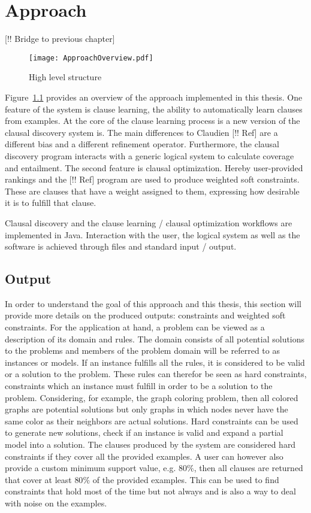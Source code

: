 \chapter{Approach}
\label{cha:meth}

[!! Bridge to previous chapter]

\begin{figure}

	\caption{High level structure}
	\centering
		\texttt{[image: ApproachOverview.pdf]}
	\label{fig:high_level_structure}

\end{figure}

Figure~\ref{fig:high_level_structure} provides an overview of the approach implemented in this thesis.
One feature of the system is clause learning, the ability to automatically learn clauses from examples.
At the core of the clause learning process is a new version of the clausal discovery system is.
The main differences to Claudien [!! Ref] are a different bias and a different refinement operator.
Furthermore, the clausal discovery program interacts with a generic logical system to calculate coverage and entailment.
The second feature is clausal optimization.
Hereby user-provided rankings and the \svm{} [!! Ref] program are used to produce weighted soft constraints.
These are clauses that have a weight assigned to them, expressing how desirable it is to fulfill that clause.

Clausal discovery and the clause learning / clausal optimization workflows are implemented in Java.
Interaction with the user, the logical system as well as the \svm{} software is achieved through files and standard input / output.

\section{Output}
In order to understand the goal of this approach and this thesis, this section will provide more details on the produced outputs: constraints and weighted soft constraints.
For the application at hand, a problem can be viewed as a description of its domain and rules.
The domain consists of all potential solutions to the problems and members of the problem domain will be referred to as instances or models.
If an instance fulfills all the rules, it is considered to be valid or a solution to the problem.
These rules can therefor be seen as hard constraints, constraints which an instance must fulfill in order to be a solution to the problem.
Considering, for example, the graph coloring problem, then all colored graphs are potential solutions but only graphs in which nodes never have the same color as their neighbors are actual solutions.
Hard constraints can be used to generate new solutions, check if an instance is valid and expand a partial model into a solution.
The clauses produced by the system are considered hard constraints if they cover all the provided examples.
A user can however also provide a custom minimum support value, e.g. $80\%$, then all clauses are returned that cover at least $80\%$ of the provided examples.
This can be used to find constraints that hold most of the time but not always and is also a way to deal with noise on the examples.

